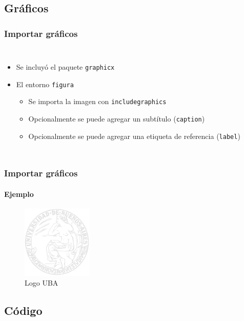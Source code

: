 \documentclass[svgnames]{beamer}
\begin{document}
\subsection{Gráficos}

\begin{frame}[fragile]
  \frametitle{Importar gráficos}
  \begin{columns}
    \centering
      
    \centering
      \begin{itemize}
        \item Se incluyó el paquete \texttt{graphicx}
        \item El entorno \texttt{figura}
        \begin{itemize}
            \item Se importa la imagen con \texttt{includegraphics}
            \item Opcionalmente se puede agregar un subtítulo (\texttt{caption})
            \item Opcionalmente se puede agregar una etiqueta de referencia (\texttt{label})
        \end{itemize}
      \end{itemize}
  \end{columns}
\end{frame}

\begin{frame}[fragile]
  \frametitle{Importar gráficos}
  \framesubtitle{Ejemplo}
  
  \begin{figure}
    \includegraphics[width=0.3\textwidth]{graficos/logo_uba}
    \caption{Logo UBA}
    \label{fig:logo_uba}
  \end{figure}
\end{frame}

\subsection{Código}
\end{document}
